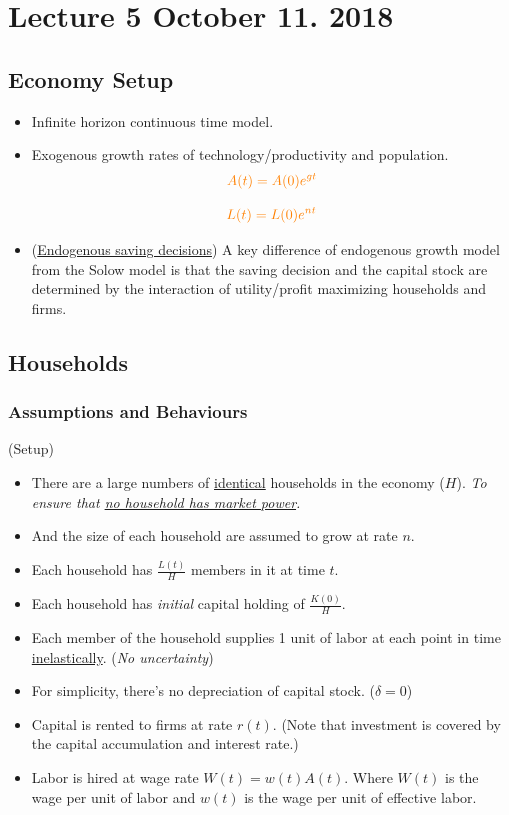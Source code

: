 \documentclass[]{article}
\begin{document}
	\section{Lecture 5 October 11. 2018}
	\subsection{Economy Setup}
	\begin{itemize}
		\item Infinite horizon continuous time model.
		\item Exogenous growth rates of technology/productivity and population.
		\begin{equation}\textcolor{orange}{
			A(t) = A(0) e^{gt}}
		\end{equation}
		
		\begin{equation}\textcolor{orange}{
			L(t) = L(0) e^{nt}
			}
		\end{equation}
		\item (\ul{Endogenous saving decisions}) A key difference of endogenous growth model from the Solow model is that the saving decision and the capital stock are determined by the interaction of utility/profit maximizing households and firms.
	\end{itemize}
	
	\subsection{Households}
	\subsubsection{Assumptions and Behaviours}
	\begin{assumption}(Setup)
		\begin{itemize}
			\item There are a large numbers of \ul{identical} households in the economy ($H$). \emph{To ensure that \ul{no household has market power}.}
			\item And the size of each household are assumed to grow at rate $n$.
			\item Each household has $\frac{L(t)}{H}$ members in it at time $t$.
			\item Each household has \emph{initial} capital holding of $\frac{K(0)}{H}$.
			\item Each member of the household supplies 1 unit of labor at each point in time \ul{inelastically}. (\emph{No uncertainty})
			\item For simplicity, there's no depreciation of capital stock. ($\delta = 0$)
			\item Capital is rented to firms at rate $r(t)$. (Note that investment is covered by the capital accumulation and interest rate.)
			\item Labor is hired at wage rate $W(t) = w(t)A(t)$. Where $W(t)$ is the wage per unit of labor and $w(t)$ is the wage per unit of effective labor.
		\end{itemize}
	\end{assumption}
	
\end{document}
